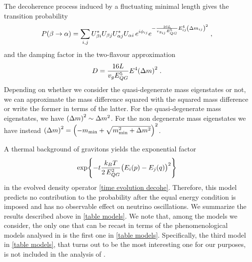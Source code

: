 \documentclass[11pt]{article}
\begin{document}
The decoherence process induced by a fluctuating minimal length \cite{Petruzziello:2020wkd} gives the transition probability
    \begin{equation}
         P(\beta\to\alpha) = \sum_{i,j} U^*_{\beta i} U_{\beta j} U^*_{\alpha j} U_{\alpha i} \,e^{i \phi_{ij}} e^{-\frac{16L}{v_{g_{ij}}E_{QG}^5}E_{ij}^4\qty(\Delta m_{ij})^2}\;,\label{Oscillation probability decoh Petruziello}
    \end{equation}
and the damping factor in the two-flavour approximation 
    \begin{equation}\label{damping factor 2 flavours Petruzziello}
        D=\frac{16L}{v_{g}E_{QG}^5}E^4\qty(\Delta m)^2\;.
    \end{equation}
Depending on whether we consider the quasi-degenerate mass eigenstates or not, we can approximate the mass difference squared with the squared mass difference or write the former in terms of the latter. For the quasi-degenerate mass eigenstates, we have $\qty(\Delta m)^2 \sim \Delta m^2$. For the non degenerate mass eigenstates we have instead $\qty(\Delta m)^2 = \qty(-m_{\text{min}}+\sqrt{m^2_{\text{min}}+\Delta m^2})^2$.
    
A thermal background of gravitons \cite{Blencowe:2012mp} yields the exponential factor 
\begin{equation}
    \exp{-t\frac{k_BT}{2\,E_{QG}^2}\qty(E_i(p)-E_j(q))^2}
\end{equation}
in the evolved density operator \eqref{time evolution decohe}. Therefore, this model predicts no contribution to the probability after the equal energy condition is imposed and has no observable effect on neutrino oscillations. We summarize the results described above in \cref{table models}. We note that, among the models we consider, the only one that can be recast in terms of the phenomenological models analysed in \cite{DeRomeri:2023dht} is the first one in \cref{table models}. Specifically, the third model in \cref{table models}, that turns out to be the most interesting one for our purposes, is not included in the analysis of \cite{DeRomeri:2023dht}.
\end{document}
